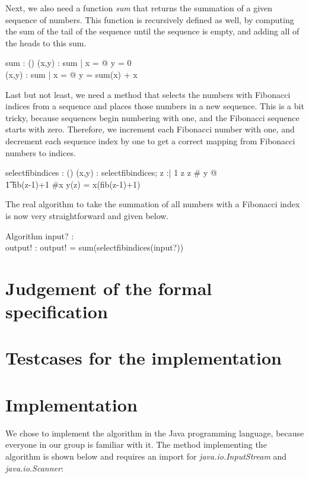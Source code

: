 \documentclass[12pt]{article}
\begin{document}
Next, we also need a function \textit{sum} that returns the summation of a given sequence of numbers. This function is recursively defined as well, by computing the sum of the tail of the sequence until the sequence is empty, and adding all of the heads to this sum.
\begin{axdef}
sum : \power (\seq \real \fun \real)
\where
\forall (x,y) : sum | x = \langle\rangle @ y = 0 \\
\forall (x,y) : sum | x \not = \langle\rangle @ y = sum(\tail x) + \head x
\end{axdef}

Last but not least, we need a method that selects the numbers with Fibonacci indices from a sequence and places those numbers in a new sequence. This is a bit tricky, because sequences begin numbering with one, and the Fibonacci sequence starts with zero. Therefore, we increment each Fibonacci number with one, and decrement each sequence index by one to get a correct mapping from Fibonacci numbers to indices.
\begin{axdef}
selectfibindices : \power (\seq \real \fun \seq \real)
\where
\forall (x,y) : selectfibindices; z :\nat | 1 \leq z \wedge z \leq \# y @ \\
\t1 fib(z-1)+1 \leq \#x \wedge y(z) = x(fib(z-1)+1)
\end{axdef}

The real algorithm to take the summation of all numbers with a Fibonacci index is now very straightforward and given below.
\begin{schema}{Algorithm}
input? : \seq \real \\
output! : \real
\where
output! = sum(selectfibindices(input?))
\end{schema}

\section{Judgement of the formal specification}

\section{Testcases for the implementation}

\section{Implementation}
We chose to implement the algorithm in the Java programming language, because everyone in our group is familiar with it. The method implementing the algorithm is shown below and requires an import for \textsl{java.io.InputStream} and \textsl{java.io.Scanner}:
\end{document}

